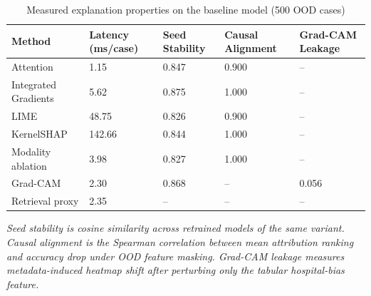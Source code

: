 \documentclass[pdflatex,sn-mathphys-num]{sn-jnl}%
\theoremstyle{thmstyleone}%
\theoremstyle{thmstyletwo}%
\theoremstyle{thmstylethree}%
\begin{document}
\begin{itemize}
\begin{table}[h!]
\centering
\caption{Measured explanation properties on the baseline model (500 OOD cases)}
\label{tab:controlled_methods}
{\scriptsize
\setlength{\tabcolsep}{4pt}
\renewcommand{\arraystretch}{1.15}
\begin{tabularx}{\textwidth}{|L{3.0cm}|Y|Y|Y|Y|}
\hline
\textbf{Method} & \textbf{Latency (ms/case)} & \textbf{Seed Stability} & \textbf{Causal Alignment} & \textbf{Grad-CAM Leakage} \\ \hline
Attention & 1.15 & 0.847 & 0.900 & -- \\ \hline
Integrated Gradients & 5.62 & 0.875 & 1.000 & -- \\ \hline
LIME & 48.75 & 0.826 & 0.900 & -- \\ \hline
KernelSHAP & 142.66 & 0.844 & 1.000 & -- \\ \hline
Modality ablation & 3.98 & 0.827 & 1.000 & -- \\ \hline
Grad-CAM & 2.30 & 0.868 & -- & 0.056 \\ \hline
Retrieval proxy & 2.35 & -- & -- & -- \\ \hline
\end{tabularx}
\par}
\vspace{4pt}
{\footnotesize\textit{Seed stability is cosine similarity across retrained models of the same variant. Causal alignment is the Spearman correlation between mean attribution ranking and accuracy drop under OOD feature masking. Grad-CAM leakage measures metadata-induced heatmap shift after perturbing only the tabular hospital-bias feature.}}
\end{table}



\end{itemize}
\end{document}
